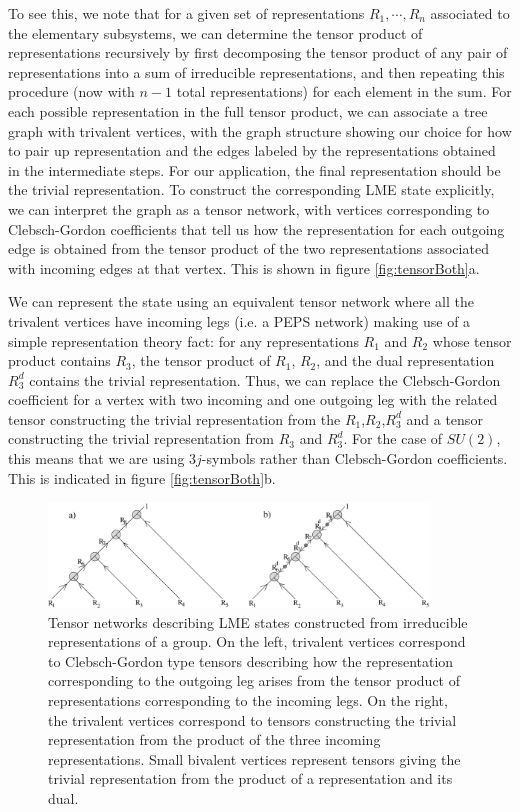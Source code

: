 \documentclass[12pt]{article}
\theoremstyle{definition}
\begin{document}
To see this, we note that for a given set of representations $R_1, \cdots, R_n$ associated to the elementary subsystems, we can determine the tensor product of representations recursively by first decomposing the tensor product of any pair of representations into a sum of irreducible representations, and then repeating this procedure (now with $n-1$ total representations) for each element in the sum. For each possible representation in the full tensor product, we can associate a tree graph with trivalent vertices, with the graph structure showing our choice for how to pair up representation and the edges labeled by the representations obtained in the intermediate steps. For our application, the final representation should be the trivial representation. To construct the corresponding LME state explicitly, we can interpret the graph as a tensor network, with vertices corresponding to Clebsch-Gordon coefficients that tell us how the representation for each outgoing edge is obtained from the tensor product of the two representations associated with incoming edges at that vertex. This is shown in figure \ref{fig:tensorBoth}a.

We can represent the state using an equivalent tensor network where all the trivalent vertices have incoming legs (i.e. a PEPS network) making use of a simple representation theory fact: for any representations $R_1$ and $R_2$ whose tensor product contains $R_3$, the tensor product of $R_1$, $R_2$, and the dual representation $R_3^d$ contains the trivial representation. Thus, we can replace the Clebsch-Gordon coefficient for a vertex with two incoming and one outgoing leg with the related tensor constructing the trivial representation from the $R_1$,$R_2$,$R_3^d$ and a tensor constructing the trivial representation from $R_3$ and $R_3^d$. For the case of $SU(2)$, this means that we are using $3j$-symbols rather than Clebsch-Gordon coefficients. This is indicated in figure \ref{fig:tensorBoth}b.

\begin{figure} \label{fig:tensorBoth}
\centering
\includegraphics[width=0.9\textwidth]{tensorBoth.eps}
\caption{Tensor networks describing LME states constructed from irreducible representations of a group. On the left, trivalent vertices correspond to Clebsch-Gordon type tensors describing how the representation corresponding to the outgoing leg arises from the tensor product of representations corresponding to the incoming legs. On the right, the trivalent vertices correspond to tensors constructing the trivial representation from the product of the three incoming representations. Small bivalent vertices represent tensors giving the trivial representation from the product of a representation and its dual.}
\label{tensorBoth}
\end{figure}
\end{document}
